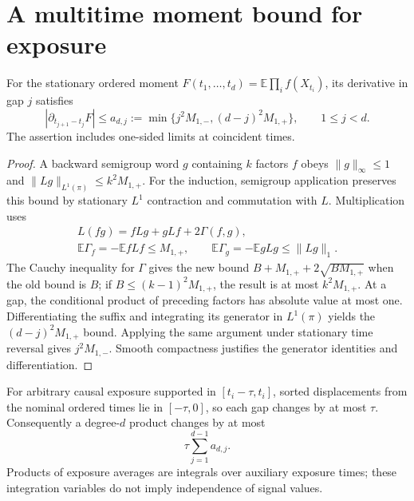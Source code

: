 \section{A multitime moment bound for exposure}

\begin{lemma}
For the stationary ordered moment
$F(t_1,\ldots,t_d)=\mathbb E\prod_i f(X_{t_i})$, its derivative in gap $j$
satisfies
\begin{equation}
 \left|\partial_{t_{j+1}-t_j}F\right|
 \le a_{d,j}:=
 \min\{j^2M_{1,-},(d-j)^2M_{1,+}\},\qquad 1\le j<d.
 \label{eq:dc-gap}
\end{equation}
The assertion includes one-sided limits at coincident times.
\end{lemma}
\begin{proof}
A backward semigroup word $g$ containing $k$ factors $f$ obeys
$\|g\|_\infty\le1$ and $\|Lg\|_{L^1(\pi)}\le k^2M_{1,+}$.
For the induction, semigroup application preserves this bound by stationary
$L^1$ contraction and commutation with $L$.  Multiplication uses
\begin{gather*}
 L(fg)=fLg+gLf+2\Gamma(f,g),\\
 \mathbb E\Gamma_f=-\mathbb E fLf\le M_{1,+},\qquad
 \mathbb E\Gamma_g=-\mathbb E gLg\le\|Lg\|_1.
\end{gather*}
The Cauchy inequality for $\Gamma$ gives the new bound
$B+M_{1,+}+2\sqrt{BM_{1,+}}$ when the old bound is $B$; if
$B\le(k-1)^2M_{1,+}$, the result is at most $k^2M_{1,+}$.
At a gap, the conditional product of preceding factors has absolute value
at most one.  Differentiating the suffix and integrating its generator in
$L^1(\pi)$ yields the $(d-j)^2M_{1,+}$ bound.  Applying the same argument
under stationary time reversal gives $j^2M_{1,-}$.  Smooth compactness
justifies the generator identities and differentiation.
\end{proof}

For arbitrary causal exposure supported in $[t_i-\tau,t_i]$, sorted
displacements from the nominal ordered times lie in $[-\tau,0]$, so each
gap changes by at most $\tau$.  Consequently a degree-$d$ product changes by
at most
\begin{equation}
 \tau\sum_{j=1}^{d-1}a_{d,j}.
 \label{eq:dc-support-blur}
\end{equation}
Products of exposure averages are integrals over auxiliary exposure times;
these integration variables do not imply independence of signal values.

